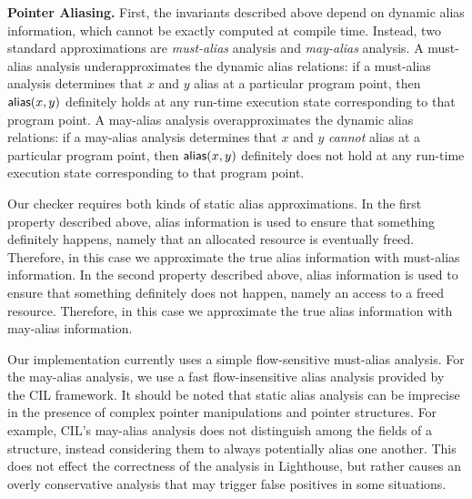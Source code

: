 \smallskip\noindent
{\bf Pointer Aliasing.}
First, the invariants described above depend on dynamic alias
information, which cannot be exactly computed at compile time.
Instead, two standard approximations are {\em must-alias} analysis and
{\em may-alias} analysis.  A must-alias analysis underapproximates the
dynamic alias relations:  if a must-alias analysis determines that $x$
and $y$ alias at a particular program point, then ${\mathsf{alias}}(x,y)$
definitely holds at any run-time execution state corresponding to that
program point.  A may-alias analysis overapproximates the dynamic
alias relations:  if a may-alias analysis determines that $x$ and $y$
{\em cannot} alias at a particular program point, then ${\mathsf{alias}}(x,y)$
definitely does not hold at any run-time execution state corresponding
to that program point.

Our checker requires both kinds of static alias approximations.  In
the first property described above, alias information is used to
ensure that something definitely happens, namely that an allocated
resource is eventually freed.  Therefore, in this case we approximate
the true alias information with must-alias information.  In the second
property described above, alias information is used to ensure that
something definitely does not happen, namely an access to a freed
resource.  Therefore, in this case we approximate the true alias
information with may-alias information.

Our implementation currently uses a simple flow-sensitive must-alias
analysis.  For the may-alias analysis, we use a fast flow-insensitive
alias analysis provided by the CIL framework.  It should be noted that 
static alias analysis
can be imprecise in the presence of complex pointer
manipulations and pointer structures.  For example, CIL's may-alias
analysis does not distinguish among the fields of a structure, instead
considering them to always potentially alias one another.  This does not
effect the correctness of the analysis in Lighthouse, but rather causes an overly 
conservative analysis that may trigger false positives in some situations.

